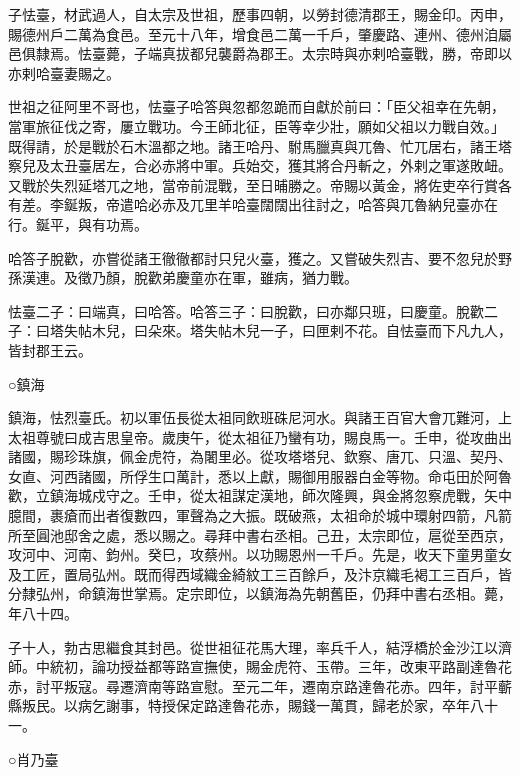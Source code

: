 \begin{pinyinscope}
 子怯臺，材武過人，自太宗及世祖，歷事四朝，以勞封德清郡王，賜金印。丙申，賜德州戶二萬為食邑。至元十八年，增食邑二萬一千戶，肇慶路、連州、德州洎屬邑俱隸焉。怯臺薨，子端真拔都兒襲爵為郡王。太宗時與亦剌哈臺戰，勝，帝即以亦剌哈臺妻賜之。



 世祖之征阿里不哥也，怯臺子哈答與忽都忽跪而自獻於前曰：「臣父祖幸在先朝，當軍旅征伐之寄，屢立戰功。今王師北征，臣等幸少壯，願如父祖以力戰自效。」既得請，於是戰於石木溫都之地。諸王哈丹、駙馬臘真與兀魯、忙兀居右，諸王塔察兒及太丑臺居左，合必赤將中軍。兵始交，獲其將合丹斬之，外剌之軍遂敗衄。又戰於失烈延塔兀之地，當帝前混戰，至日晡勝之。帝賜以黃金，將佐吏卒行賞各有差。李鋋叛，帝遣哈必赤及兀里羊哈臺闊闊出往討之，哈答與兀魯納兒臺亦在行。鋋平，與有功焉。



 哈答子脫歡，亦嘗從諸王徹徹都討只兒火臺，獲之。又嘗破失烈吉、要不忽兒於野孫漢連。及徵乃顏，脫歡弟慶童亦在軍，雖病，猶力戰。



 怯臺二子：曰端真，曰哈答。哈答三子：曰脫歡，曰亦鄰只班，曰慶童。脫歡二子：曰塔失帖木兒，曰朵來。塔失帖木兒一子，曰匣剌不花。自怯臺而下凡九人，皆封郡王云。



 ○鎮海



 鎮海，怯烈臺氏。初以軍伍長從太祖同飲班硃尼河水。與諸王百官大會兀難河，上太祖尊號曰成吉思皇帝。歲庚午，從太祖征乃蠻有功，賜良馬一。壬申，從攻曲出諸國，賜珍珠旗，佩金虎符，為闍里必。從攻塔塔兒、欽察、唐兀、只溫、契丹、女直、河西諸國，所俘生口萬計，悉以上獻，賜御用服器白金等物。命屯田於阿魯歡，立鎮海城戍守之。壬申，從太祖謀定漢地，師次隆興，與金將忽察虎戰，矢中臆間，裹瘡而出者復數四，軍聲為之大振。既破燕，太祖命於城中環射四箭，凡箭所至圓池邸舍之處，悉以賜之。尋拜中書右丞相。己丑，太宗即位，扈從至西京，攻河中、河南、鈞州。癸巳，攻蔡州。以功賜恩州一千戶。先是，收天下童男童女及工匠，置局弘州。既而得西域織金綺紋工三百餘戶，及汴京織毛褐工三百戶，皆分隸弘州，命鎮海世掌焉。定宗即位，以鎮海為先朝舊臣，仍拜中書右丞相。薨，年八十四。



 子十人，勃古思繼食其封邑。從世祖征花馬大理，率兵千人，結浮橋於金沙江以濟師。中統初，論功授益都等路宣撫使，賜金虎符、玉帶。三年，改東平路副達魯花赤，討平叛寇。尋遷濟南等路宣慰。至元二年，遷南京路達魯花赤。四年，討平蘄縣叛民。以病乞謝事，特授保定路達魯花赤，賜錢一萬貫，歸老於家，卒年八十一。



 ○肖乃臺




\end{pinyinscope}

